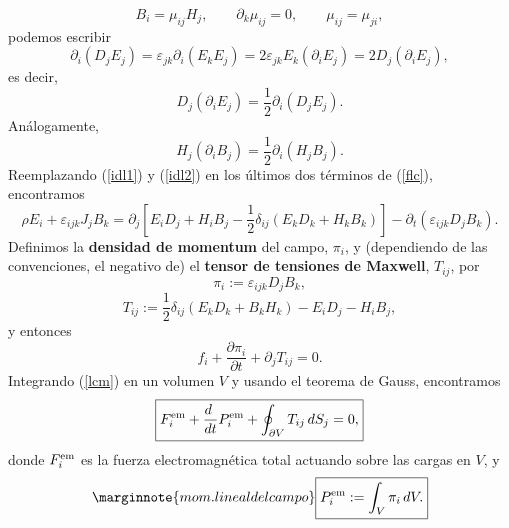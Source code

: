 \begin{equation}
 B_i=\mu_{ij}H_j, \qquad \partial_k\mu_{ij}=0,\qquad \mu_{ij}=\mu_{ji},
\end{equation}
podemos escribir
\begin{equation}
 \partial_i(D_jE_j)=\varepsilon_{jk}\partial_i(E_kE_j)=2\varepsilon_{jk}
E_k(\partial_i E_j)=2D_j(\partial_i E_j),
\end{equation}
es decir,
\begin{equation}
 D_j(\partial_i E_j)=\frac{1}{2}\partial_i(D_jE_j). \label{idl1}
\end{equation}
Análogamente,
\begin{equation}
 H_j(\partial_i B_j)=\frac{1}{2}\partial_i(H_jB_j). \label{idl2}
\end{equation}
Reemplazando (\ref{idl1}) y (\ref{idl2}) en los últimos dos términos de
(\ref{flc}), encontramos
\begin{equation}
 \rho E_i+\varepsilon_{ijk}J_jB_k
=\partial_j\left[E_iD_j+H_iB_j-\frac{1}{2}\delta_{ij}\left(
E_kD_k+H_kB_k\right)\right]-\partial_t(\varepsilon_{ijk}D_jB_k).
\end{equation}
Definimos la \textbf{densidad de momentum} del campo, $\pi_i$, y (dependiendo de las convenciones, el negativo de) el \textbf{tensor de tensiones de Maxwell}, $T_{ij}$, por
\begin{equation}
\boxed{\pi_i:=\varepsilon_{ijk}D_jB_k,}
\end{equation}
\begin{equation}
 \boxed{T_{ij}:=\frac{1}{2}\delta_{ij}\left(E_kD_k+B_kH_k\right)-E_iD_j-H_iB_j,}
\end{equation}
y entonces
\begin{equation}
\boxed{f_i+\frac{\partial\pi_i }{\partial t}+\partial_jT_{ij}=0.} \label{lcm}
\end{equation}
Integrando (\ref{lcm}) en un volumen $V$ y usando el teorema de Gauss,
encontramos
\begin{equation}
\boxed{F^{\rm em}_i+\frac{d\ }{dt}P_i^{\rm em}+\oint_{\partial
V}T_{ij}\,dS_j =0,} 
\end{equation}
donde $F^{\rm em}_i$ es la fuerza electromagnética total actuando sobre las cargas en $V$, y
\begin{equation}\marginnote{mom. lineal del campo}
 \boxed{P_i^{\rm em}:=\int_V \pi_i\,dV.} \label{defpem}
\end{equation}

